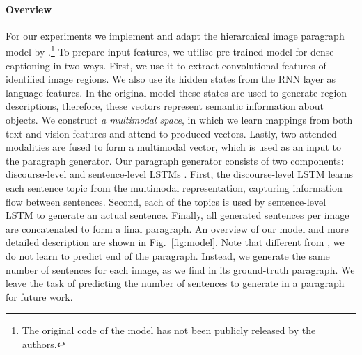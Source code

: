 \documentclass[11pt,a4paper]{article}
\newcommand{\kibitz}[2]{\ifnum\Comments=1\textcolor{#1}{#2}\fi}
\newcommand{\nikolai}[1]{\kibitz{red}      {[Nikolai: #1]}}
\begin{document}
\paragraph{Overview}
For our experiments we implement and adapt the hierarchical image paragraph model by \cite{krause2016hierarchical}.\footnote{The original code of the model has not been publicly released by the authors.}
To prepare input features, we utilise pre-trained model for dense captioning \cite{densecap} in two ways.
First, we use it to extract convolutional features of identified image regions.
We also use its hidden states from the RNN layer as language features.
In the original model these states are used to generate region descriptions, therefore, these vectors represent semantic information about objects.
We construct \textit{a multimodal space}, in which we learn mappings from both text and vision features and attend to produced vectors.
Lastly, two attended modalities are fused to form a multimodal vector, which is used as an input to the paragraph generator.
Our paragraph generator consists of two components: discourse-level and sentence-level LSTMs \cite{lstm97}.
First, the discourse-level LSTM learns each sentence topic from the multimodal representation, capturing information flow between sentences.
Second, each of the topics is used by sentence-level LSTM to generate an actual sentence.
Finally, all generated sentences per image are concatenated to form a final paragraph.
An overview of our model and more detailed description are shown in Fig.~\ref{fig:model}.
Note that different from , we do not learn to predict end of the paragraph.
Instead, we generate the same number of sentences for each image, as we find in its ground-truth paragraph.
We leave the task of predicting the number of sentences to generate in a paragraph for future work.

\end{document}
